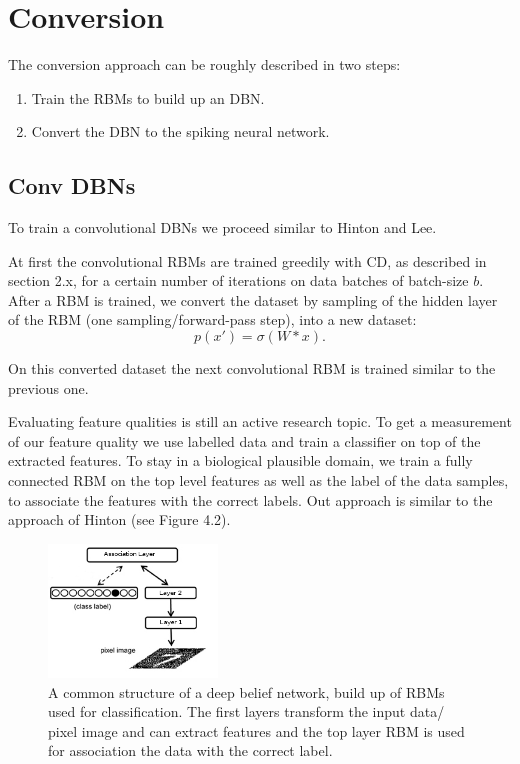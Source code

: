 \section{Conversion}

The conversion approach can be roughly described in two steps:
\begin{enumerate}
\item Train the RBMs to build up an DBN.
\item Convert the DBN to the spiking neural network.
\end{enumerate}


\subsection{Conv DBNs}

To train a convolutional DBNs we proceed similar to Hinton and Lee.

At first the convolutional RBMs are trained greedily with CD, as described in section 2.x, for a certain number of iterations on data batches of batch-size $b$.
After a RBM is trained, we convert the dataset by sampling of the hidden layer of the RBM (one sampling/forward-pass step), into a new dataset:
\[
p(x') = \sigma(W * x) .
\]

On this converted dataset the next convolutional RBM is trained similar to the previous one.

Evaluating feature qualities is still an active research topic.
To get a measurement of our feature quality we use labelled data and train a classifier on top of the extracted features.
To stay in a biological plausible domain, we train a fully connected RBM on the top level features as well as the label of the data samples, to associate the features with the correct labels.
Out approach is similar to the approach of Hinton (see Figure 4.2).

\begin{figure}
	\centering
    	\includegraphics[width=0.4\textwidth]{imgs/dbn_mnist.png} 
    \caption{A common structure of a deep belief network, build up of RBMs used for classification. The first layers transform the input data/ pixel image and can extract features and the top layer RBM is used for association the data with the correct label.}
	\label{fig:dbnmnist}
\end{figure}

